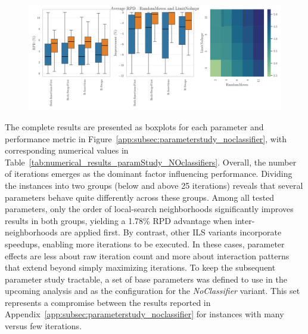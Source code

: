 \begin{figure}[ht]
	\centering
	\begin{minipage}[t]{0.49\textwidth}
		\centering
		\label{fig:average_iterations_noclassifier}
	\end{minipage}\hfill
	\begin{minipage}[t]{0.49\textwidth}
		\centering
		\includegraphics[width=\linewidth]{pictures/heatmap_randomMoves_limitNoImpr.png}
		\label{fig:heatmap_parameter_study}
	\end{minipage}
\end{figure}

The complete results are presented as boxplots for each parameter and performance metric in Figure~\ref{app:subsec:parameterstudy_noclassifier},
with corresponding numerical values in Table~\ref{tab:numerical_results_paramStudy_NOclassifiers}. Overall, the number of
iterations emerges as the dominant factor influencing performance. Dividing the instances into two groups (below and above 25 iterations)
reveals that several parameters behave quite differently across these groups.
Among all tested parameters, only the order of local-search neighborhoods significantly improves results in both groups, yielding a
1.78\% \gls{RPD} advantage when inter-neighborhoods are applied first. By contrast, other \gls{ILS} variants incorporate speedups,
enabling more iterations to be executed. In these cases, parameter effects are less about raw iteration count and more about
interaction patterns that extend beyond simply maximizing iterations. To keep the subsequent parameter study tractable,
a set of base parameters was defined to use in the upcoming analysis and as the configuration for the \textit{NoClassifier} variant.
This set represents a compromise between the results reported in Appendix~\ref{app:subsec:parameterstudy_noclassifier} for instances with
many versus few iterations.

